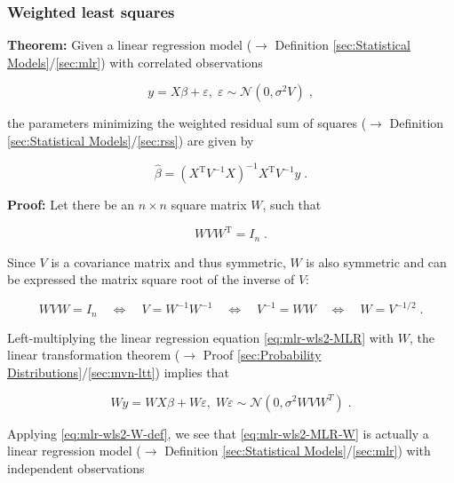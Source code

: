 \documentclass[a4paper,12pt,twoside]{book}
\begin{document}
\subsubsection[\textbf{Weighted least squares}]{Weighted least squares} \label{sec:mlr-wls2}
\setcounter{equation}{0}

\textbf{Theorem:} Given a linear regression model ($\rightarrow$ Definition \ref{sec:Statistical Models}/\ref{sec:mlr}) with correlated observations

\begin{equation} \label{eq:mlr-wls2-MLR}
y = X\beta + \varepsilon, \; \varepsilon \sim \mathcal{N}(0, \sigma^2 V) \; ,
\end{equation}

the parameters minimizing the weighted residual sum of squares ($\rightarrow$ Definition \ref{sec:Statistical Models}/\ref{sec:rss}) are given by

\begin{equation} \label{eq:mlr-wls2-WLS}
\hat{\beta} = (X^\mathrm{T} V^{-1} X)^{-1} X^\mathrm{T} V^{-1} y \; .
\end{equation}


\vspace{1em}
\textbf{Proof:} Let there be an $n \times n$ square matrix $W$, such that

\begin{equation} \label{eq:mlr-wls2-W-def}
W V W^\mathrm{T} = I_n \; .
\end{equation}

Since $V$ is a covariance matrix and thus symmetric, $W$ is also symmetric and can be expressed the matrix square root of the inverse of $V$:

\begin{equation} \label{eq:mlr-wls2-W-V}
W V W = I_n \quad \Leftrightarrow \quad V = W^{-1} W^{-1} \quad \Leftrightarrow \quad V^{-1} = W W \quad \Leftrightarrow \quad W = V^{-1/2} \; .
\end{equation}

Left-multiplying the linear regression equation \eqref{eq:mlr-wls2-MLR} with $W$, the linear transformation theorem ($\rightarrow$ Proof \ref{sec:Probability Distributions}/\ref{sec:mvn-ltt}) implies that

\begin{equation} \label{eq:mlr-wls2-MLR-W}
Wy = WX\beta + W\varepsilon, \; W\varepsilon \sim \mathcal{N}(0, \sigma^2 W V W^T) \; .
\end{equation}

Applying \eqref{eq:mlr-wls2-W-def}, we see that \eqref{eq:mlr-wls2-MLR-W} is actually a linear regression model ($\rightarrow$ Definition \ref{sec:Statistical Models}/\ref{sec:mlr}) with independent observations
\end{document}
